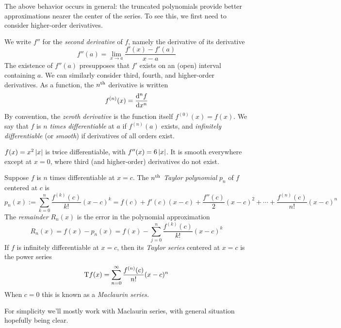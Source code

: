 The above behavior occurs in general: the truncated polynomials provide better approximations nearer the center of the series. To see this, we first need to consider higher-order derivatives.

\begin{defn}{}{}
	We write $f''$ for the \emph{second derivative} of $f$, namely the derivative of its derivative
	\[
		f''(a)=\lim_{x\to a}\frac{f'(x)-f'(a)}{x-a}
	\]
	The existence of $f''(a)$ presupposes that $f'$ exists on an (open) interval containing $a$. We can similarly consider third, fourth, and higher-order derivatives. As a function, the $n\th$ derivative is written
	\[
		f^{(n)}(x)=\diff[^nf]{x^n}
	\]
	By convention, the \emph{zeroth derivative} is the function itself $f^{(0)}(x)=f(x)$. We say that $f$ is \emph{$n$ times differentiable} at $a$ if $f^{(n)}(a)$ exists, and \emph{infinitely differentiable} (or \emph{smooth}) if derivatives of all orders exist.
\end{defn}

\begin{example}{}{}
	$f(x)=x^2\nm x$ is twice differentiable, with $f''(x)=6\nm x$. It is smooth everywhere except at $x=0$, where third (and higher-order) derivatives do not exist.
\end{example}


\goodbreak


\begin{defn}{}{}
	Suppose $f$ is $n$ times differentiable at $x=c$. The \emph{$n\th$ Taylor polynomial} $p_n$ of $f$ centered at $c$ is
	\[
		p_n(x):=\sum_{k=0}^n\frac{f^{(k)}(c)}{k!}(x-c)^k 
		=f(c)+f'(c)(x-c)+\frac{f''(c)}2(x-c)^2+\cdots+\frac{f^{(n)}(c)}{n!}(x-c)^n
	\]
	The \emph{remainder} $R_n(x)$ is the error in the polynomial approximation
	\[
		R_n(x)=f(x)-p_n(x)
		=f(x)-\sum_{j=0}^{n}\frac{f^{(k)}(c)}{k!}(x-c)^k
	\]
	If $f$ is infinitely differentiable at $x=c$, then its \emph{Taylor series} centered at $x=c$ is the power series
	\[
		\rT f(x) =\sum_{n=0}^\infty\frac{f^{(n)}(c)}{n!}(x-c)^n
	\]
	When $c=0$ this is known as a \emph{Maclaurin series.}\footnotemark
\end{defn}


For simplicity we'll mostly work with Maclaurin series, with general situation hopefully being clear.


